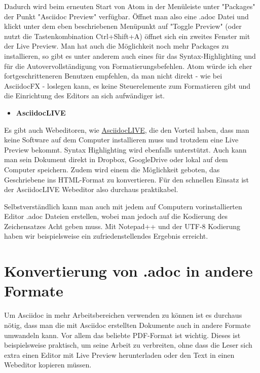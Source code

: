 \documentclass[11pt]{amsbook}
\begin{document}
Dadurch wird beim erneuten Start von Atom in der Menüleiste unter "Packages" der Punkt "Asciidoc Preview" verfügbar. Öffnet man also eine .adoc Datei und klickt unter dem eben beschriebenen Menüpunkt auf "Toggle Preview" (oder nutzt die Tastenkombination Ctrl+Shift+A) öffnet sich ein zweites Fenster mit der Live Preview. Man hat auch die Möglichkeit noch mehr Packages zu installieren, so gibt es unter anderem auch eines für das Syntax-Highlighting und für die Autovervollständigung von Formatierungsbefehlen. Atom würde ich eher fortgeschritteneren Benutzen empfehlen, da man nicht direkt - wie bei AsciidocFX -  loslegen kann, es keine Steuerelemente zum Formatieren gibt und die Einrichtung des Editors an sich aufwändiger ist.


\begin{itemize}

\item \textbf{AsciidocLIVE}

\end{itemize}


Es gibt auch Webeditoren, wie \href{https://asciidoclive.com/edit/scratch/1}{AsciidocLIVE}, die den Vorteil haben, dass man keine Software auf dem Computer installieren muss und trotzdem eine Live Preview bekommt. Syntax Highlighting wird ebenfalls unterstützt. Auch kann man sein Dokument direkt in Dropbox, GoogleDrive oder lokal auf dem Computer speichern. Zudem wird einem die Möglichkeit geboten, das Geschriebene ins HTML-Format zu konvertieren. Für den schnellen Einsatz ist der AsciidocLIVE Webeditor also durchaus praktikabel.


Selbstverständlich kann man auch mit jedem auf Computern vorinstallierten Editor .adoc Dateien erstellen, wobei man jedoch auf die Kodierung des Zeichensatzes Acht geben muss. Mit Notepad++ und der UTF-8 Kodierung haben wir beispielsweise ein zufriedenstellendes Ergebnis erreicht.


\hypertarget{x-konvertierung-von-.adoc-in-andere-formate}{\chapter*{Konvertierung von .adoc in andere Formate}}
Um Asciidoc in mehr Arbeitsbereichen verwenden zu können ist es durchaus nötig, dass man die mit Asciidoc erstellten Dokumente auch in andere Formate umwandeln kann. Vor allem das beliebte PDF-Format ist wichtig. Dieses ist beispielsweise praktisch, um seine Arbeit zu verbreiten, ohne dass die Leser sich extra einen Editor mit Live Preview herunterladen oder den Text in einen Webeditor kopieren müssen.
\end{document}
